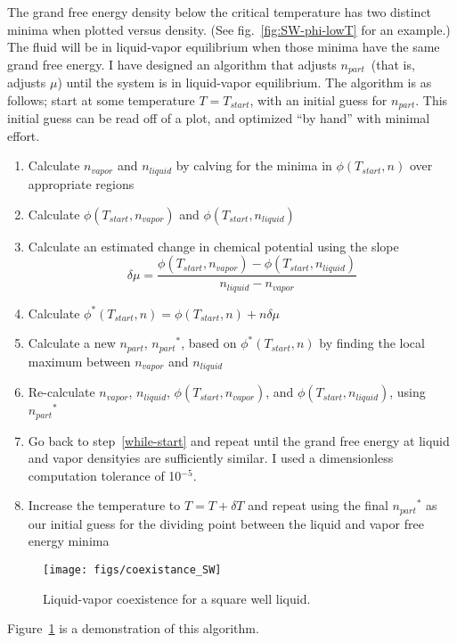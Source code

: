 \documentclass[letterpaper,twocolumn,amsmath,amssymb,prb]{revtex4-1}
\newcommand{\npart}{\ensuremath{n_\textit{part}}}
\newcommand{\nliq}{\ensuremath{n_\textit{liquid}}}
\newcommand{\nvap}{\ensuremath{n_\textit{vapor}}}
\begin{document}
The grand free energy density below the critical temperature has two distinct minima when
plotted versus density. (See fig.~\ref{fig:SW-phi-lowT} for an
example.) The fluid will be in liquid-vapor equilibrium when those
minima have the same grand free energy. I have designed an algorithm
that adjusts \npart\ (that is, adjusts $\mu$) until the system is in
liquid-vapor equilibrium.  The algorithm is as follows; start at some
temperature $T=T_{start}$, with an initial guess for $\npart$. This
initial guess can be read off of a plot, and optimized ``by hand''
with minimal effort.
\begin{enumerate}
  \item Calculate $\nvap$ and $\nliq$ by calving for the minima in $\phi(T_{start},n)$ over appropriate regions
  \item Calculate $\phi(T_{start},\nvap)$ and $\phi(T_{start},\nliq)$ \label{while-start}
  \item Calculate an estimated change in chemical potential using the slope \[\delta\mu = \frac{\phi(T_{start},\nvap) - \phi(T_{start},\nliq)}{\nliq - \nvap}\]
  \item Calculate $\phi^*(T_{start},n) = \phi(T_{start},n) + n\delta\mu$
  \item Calculate a new $\npart$, $\npart^*$, based on $\phi^*(T_{start},n)$ by finding the local maximum between $\nvap$ and $\nliq$
  \item Re-calculate $\nvap$, $\nliq$, $\phi(T_{start},\nvap)$, and $\phi(T_{start},\nliq)$, using $\npart^*$
  \item Go back to step~\ref{while-start} and repeat until the grand free energy at liquid and vapor densityies are sufficiently similar. I used a dimensionless computation tolerance of 10$^{-5}$.
  \item Increase the temperature to $T = T + \delta T$ and repeat using the final $\npart^*$ as our initial guess for the dividing point between the liquid and vapor free energy minima
\end{enumerate}

\begin{figure}
  \begin{center}
  \texttt{[image: figs/coexistance\_SW]}
  \end{center}
  \caption{Liquid-vapor coexistence for a square well liquid.}
  \label{fig:coexistance_SW}
\end{figure}

Figure~\ref{fig:coexistance_SW} is a demonstration of this algorithm.
\end{document}
